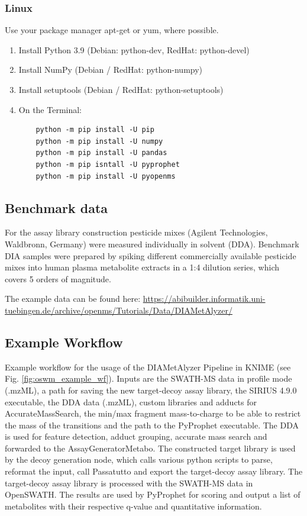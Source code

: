 \subsubsection{Linux}
Use your package manager apt-get or yum, where possible.
\begin{enumerate}
  \item Install Python 3.9 (Debian: python-dev, RedHat: python-devel)
  \item Install NumPy (Debian / RedHat: python-numpy)
  \item Install setuptools (Debian / RedHat: python-setuptools)
  \item On the Terminal:
    \begin{lstlisting}
    python -m pip install -U pip
    python -m pip install -U numpy
    python -m pip install -U pandas
    python -m pip isntall -U pyprophet
    python -m pip install -U pyopenms
    \end{lstlisting}
\end{enumerate}

\subsection{Benchmark data}
For the assay library construction pesticide mixes (Agilent Technologies, Waldbronn, Germany) were measured individually in solvent (DDA). 
Benchmark DIA samples were prepared by spiking different commercially available pesticide mixes into human plasma metabolite extracts in a 1:4 dilution series, which covers 5 orders of magnitude.

\noindent The example data can be found here:
\url{https://abibuilder.informatik.uni-tuebingen.de/archive/openms/Tutorials/Data/DIAMetAlyzer/}

\subsection{Example Workflow}
Example workflow for the usage of the DIAMetAlyzer Pipeline in KNIME (see Fig. \ref{fig:oswm_example_wf}). Inputs are the SWATH-MS data in profile mode (.mzML), a path for saving the new target-decoy assay library, the SIRIUS 4.9.0 executable, the DDA data (.mzML), custom libraries and adducts for AccurateMassSearch, the min/max fragment mass-to-charge to be able to restrict the mass of the transitions and the path to the PyProphet executable. The DDA is used for feature detection, adduct grouping, accurate mass search and forwarded to the AssayGeneratorMetabo. The constructed target library is used by the decoy generation node, which calls various python scripts to parse, reformat the input, call Passatutto and export the target-decoy assay library. The target-decoy assay library is processed with the SWATH-MS data in OpenSWATH. The results are used by PyProphet for scoring and output a list of metabolites with their respective q-value and quantitative information.

